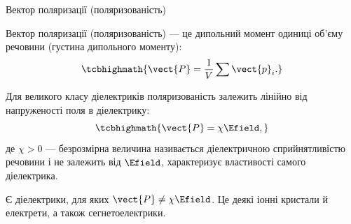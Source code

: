 \documentclass[onlytextwidth]{beamer}
\begin{document}
\begin{frame}{Вектор поляризації (поляризованість)}{}
	\begin{block}{}\justifying
		\alert{Вектор поляризації (поляризованість)} --- це дипольний момент одиниці об'єму
		речовини (густина дипольного моменту):
		\begin{equation*}
			\tcbhighmath{
				\vect{P} = \dfrac1V \sum \vect{p}_i.
			}
		\end{equation*}
	\end{block}

	\begin{block}{}\justifying
		Для великого класу діелектриків \alert{поляризованість залежить лінійно
			від напруженості поля} в діелектрику:
		\begin{equation*}
			\tcbhighmath{
				\vect{P} = \chi \Efield,
			}
		\end{equation*}
		де $\chi > 0$ --- безрозмірна величина називається \alert{діелектричною сприйнятливістю
			речовини} і не залежить від $\Efield$, характеризує властивості самого діелектрика.
	\end{block}


	\begin{alertblock}{}\justifying
		Є діелектрики, для яких $\vect{P} \neq \chi \Efield$. Це деякі іонні кристали й
		електрети, а також сегнетоелектрики.
	\end{alertblock}

\end{frame}
\end{document}
